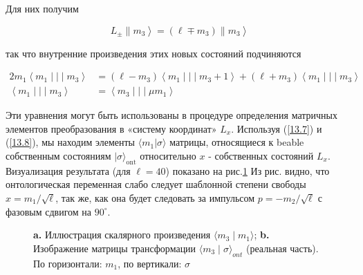 \documentclass[main.tex]{subfiles}
\begin{document}
Для них получим

\begin{equation}\label{13.14}
	\left.\left.L_{\pm} \| m_{3}\right\rangle=\left(\ell \mp m_{3}\right) \| m_{3}\right\rangle
\end{equation}

так что внутренние произведения этих новых состояний подчиняются

\begin{equation}\label{13.15}
	\begin{aligned} 2 m_{1}\left\langle m_{1} \mid\mid\mid m_{3}\right\rangle &=\left(\ell-m_{3}\right)\left\langle m_{1} \mid\mid\mid m_{3}+1\right\rangle+\left(\ell+m_{3}\right)\left\langle m_{1} \mid\mid\mid m_{3}\right\rangle \\\left\langle m_{1} \mid\mid\mid m_{3}\right\rangle &=\left\langle m_{3} \mid\mid\mid \mu m_{1}\right\rangle \end{aligned}
\end{equation}

Эти уравнения могут быть использованы в процедуре определения матричных элементов преобразования в «систему координат» $L_x$. Используя (\ref{13.7}) и (\ref{13.8}), мы находим элементы $\langle m_1|\sigma\rangle$ матрицы, относящиеся к beable собственным состояниям $|\sigma\rangle_\mathrm{ont}$ относительно $x$ - собственных состояний $L_x$. Визуализация результата (для $\ell = 40$) показано на рис.\ref{i13.1} Из рис. видно, что онтологическая переменная слабо следует шаблонной степени свободы $x = m_1/\sqrt{\ell}$, так же, как она будет следовать за импульсом $p = -m_2/\sqrt{\ell}$ с фазовым сдвигом на $90^\circ$.

\begin{figure}[ht] %
\begin{center}
\caption{
\label{i13.1} \textbf{a.} Иллюстрация скалярного произведения $\langle m_3\mid m_1\rangle$; \textbf{b.} Изображение матрицы трансформации $\langle m_3\mid \sigma\rangle_{ont}$ (реальная часть). По горизонтали: $m_1$, по вертикали: $\sigma$}
\end {center}
\end {figure}
\end{document}
